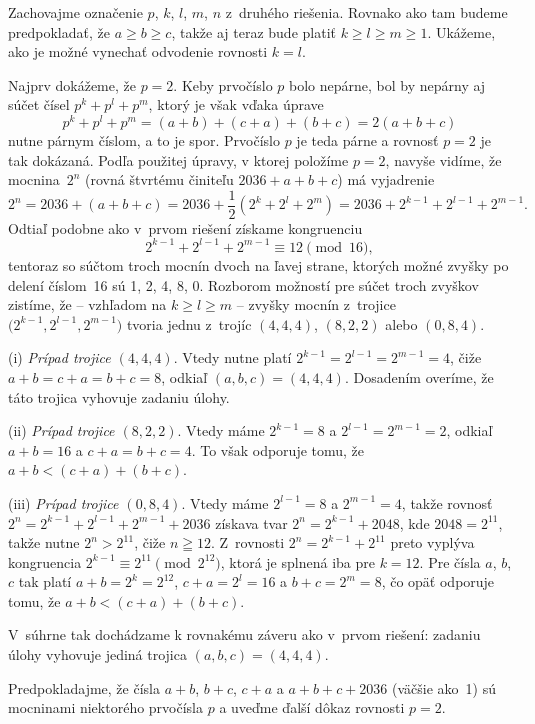{\ineriesenie
Zachovajme označenie $p$, $k$, $l$, $m$, $n$ z~druhého riešenia.
Rovnako ako tam budeme predpokladať, že $a\geq b\geq c$, takže aj teraz
bude platiť $k\geq l\geq m\geq 1$. Ukážeme, ako je možné vynechať
odvodenie rovnosti $k=l$.

Najprv dokážeme, že $p=2$.
Keby prvočíslo $p$ bolo nepárne, bol by nepárny aj súčet
čísel
$p^k + p^l + p^m$, ktorý je však vďaka úprave
$$
p^k + p^l + p^m = (a+b)+(c+a)+(b+c)=2(a+b+c)
$$
nutne párnym číslom, a to je spor. Prvočíslo $p$ je teda párne
a rovnosť $p=2$ je tak dokázaná. Podľa použitej úpravy, v ktorej
položíme $p=2$, navyše vidíme, že mocnina~$2^n$
(rovná štvrtému činiteľu $2036+a+b+c$) má vyjadrenie
$$
2^n=2036+(a+b+c)=2036+\dfrac12(2^k+2^l+2^m)=
2036+2^{k-1}+2^{l-1}+2^{m-1}.
$$
Odtiaľ podobne ako v~prvom riešení získame kongruenciu
$$
2^{k-1} + 2^{l-1} + 2^{m-1}\equiv 12 \pmod {16},
$$
tentoraz so súčtom troch mocnín dvoch na ľavej strane,
ktorých možné zvyšky po delení číslom~16 sú 1, 2, 4, 8, 0.
Rozborom možností pre súčet troch zvyškov zistíme,
že -- vzhľadom na $k\geq l\geq m$ --
zvyšky mocnín z~trojice $\bigl(2^{k-1},2^{l-1},2^{m-1}\bigr)$ tvoria
jednu z~trojíc $(4,4,4)$, $(8,2,2)$ alebo $(0,8,4)$.

(i) {\it Prípad trojice $(4,4,4)$}. Vtedy nutne platí
$2^{k-1}=2^{l-1}=2^{m-1}=4$, čiže $a+b=c+a=b+c=8$,
odkiaľ $(a,b,c) = (4,4,4)$. Dosadením overíme, že
táto trojica vyhovuje zadaniu úlohy.

(ii) {\it Prípad trojice $(8,2,2)$}. Vtedy máme $2^{k-1} = 8$ a
$2^{l-1} = 2^{m-1} = 2$, odkiaľ $a+b=16$ a $c+a=b+c=4$. To však
odporuje tomu, že $a+b<(c+a)+(b+c)$.

(iii) {\it Prípad trojice $(0,8,4)$}. Vtedy máme
$2^{l-1} = 8$ a $2^{m-1} = 4$, takže rovnosť
$2^n= 2^{k-1} + 2^{l-1} + 2^{m-1} + 2036$ získava tvar
$2^n=2^{k-1} + 2048$, kde $2048=2^{11}$, takže nutne $2^n>2^{11}$,
čiže $n\geqq12$. Z~rovnosti $2^n=2^{k-1}+2^{11}$ preto vyplýva
kongruencia $2^{k-1} \equiv 2^{11}\pmod{2^{12}}$, ktorá je splnená
iba pre $k=12$. Pre čísla $a$, $b$, $c$ tak platí
$a+b = 2^k = 2^{12}$, $c+a = 2^l=16$ a $b+c=2^m=8$, čo
opäť odporuje tomu, že $a+b<(c+a)+(b+c)$.

V~súhrne tak dochádzame k rovnakému záveru ako v~prvom riešení:
zadaniu úlohy vyhovuje jediná trojica $(a,b,c)=(4,4,4)$.

\poznamka
Predpokladajme, že čísla $a+b$, $b+c$, $c+a$ a $a+b+c+2036$
(väčšie ako~1) sú mocninami niektorého prvočísla $p$
a uveďme ďalší dôkaz rovnosti $p=2$.

}
